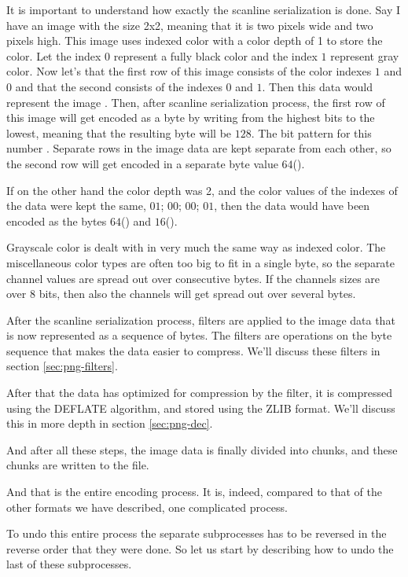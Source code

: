 It is important to understand how exactly the scanline serialization
is done. Say I have an image with the size 2x2, meaning that it is two
pixels wide and two pixels high. This image uses indexed color with a
color depth of 1 to store the color. Let the index $0$ represent a
fully black color and the index $1$ represent gray color. Now let's
that the first row of this image consists of the color indexes $1$ and
$0$ and that the second consists of the indexes $0$ and $1$. Then this
data would represent the image \checkerimg. Then, after scanline
serialization process, the first row of this image will get encoded as
a byte by writing from the highest bits to the lowest, meaning that
the resulting byte will be $128$. The bit pattern for this number
. Separate rows in the image data are kept
separate from each other, so the second row will get encoded in a
separate byte value $64$().

If on the other hand the color depth was 2, and the color values of
the indexes of the data were kept the same, $01$; $00$; $00$; $01$,
then the data would have been encoded as the bytes
$64$() and $16$().

Grayscale color is dealt with in very much the same way as indexed
color. The miscellaneous color types are often too big to fit in a
single byte, so the separate channel values are spread out over
consecutive bytes. If the channels sizes are over 8 bits, then also
the channels will get spread out over several bytes.

After the scanline serialization process, filters are applied to the
image data that is now represented as a sequence of bytes. The filters
are operations on the byte sequence that makes the data easier to
compress. We'll discuss these filters in section
\ref{sec:png-filters}.

After that the data has optimized for compression by the filter, it is
compressed using the DEFLATE algorithm, and stored using the ZLIB
format. We'll discuss this in more depth in section \ref{sec:png-dec}.

And after all these steps, the image data is finally divided into
\IDAT chunks, and these chunks are written to the file.

And that is the entire encoding process. It is, indeed, compared to
that of the other formats we have described, one complicated process.

To undo this entire process the separate subprocesses has to be
reversed in the reverse order that they were done. So let us start by
describing how to undo the last of these subprocesses.

